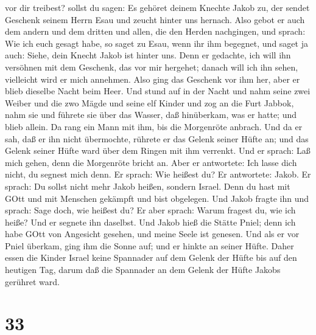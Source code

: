 vor dir treibest?  sollst du sagen: Es gehöret deinem
Knechte Jakob zu, der sendet Geschenk seinem Herrn Esau und zeucht
hinter uns hernach.  Also gebot er auch dem andern und dem
dritten und allen, die den Herden nachgingen, und sprach: Wie ich euch
gesagt habe, so saget zu Esau, wenn ihr ihm begegnet,  und
saget ja auch: Siehe, dein Knecht Jakob ist hinter uns. Denn er
gedachte, ich will ihn versöhnen mit dem Geschenk, das vor mir hergehet;
danach will ich ihn sehen, vielleicht wird er mich annehmen.
 Also ging das Geschenk vor ihm her, aber er blieb dieselbe
Nacht beim Heer.  Und stund auf in der Nacht und nahm seine
zwei Weiber und die zwo Mägde und seine elf Kinder und zog an die Furt
Jabbok,  nahm sie und führete sie über das Wasser, daß
hinüberkam, was er hatte;  und blieb allein. Da rang ein
Mann mit ihm, bis die Morgenröte anbrach.  Und da er sah,
daß er ihn nicht übermochte, rührete er das Gelenk seiner Hüfte an; und
das Gelenk seiner Hüfte ward über dem Ringen mit ihm verrenkt.
 Und er sprach: Laß mich gehen, denn die Morgenröte bricht
an. Aber er antwortete: Ich lasse dich nicht, du segnest mich denn.
 Er sprach: Wie heißest du? Er antwortete: Jakob.
 Er sprach: Du sollst nicht mehr Jakob heißen, sondern
Israel. Denn du hast mit GOtt und mit Menschen gekämpft und bist
obgelegen.  Und Jakob fragte ihn und sprach: Sage doch, wie
heißest du? Er aber sprach: Warum fragest du, wie ich heiße? Und er
segnete ihn daselbst.  Und Jakob hieß die Stätte Pniel;
denn ich habe GOtt von Angesicht gesehen, und meine Seele ist genesen.
 Und als er vor Pniel überkam, ging ihm die Sonne auf; und
er hinkte an seiner Hüfte.  Daher essen die Kinder Israel
keine Spannader auf dem Gelenk der Hüfte bis auf den heutigen Tag, darum
daß die Spannader an dem Gelenk der Hüfte Jakobs gerühret ward.

\hypertarget{section-32}{%
\section{33}\label{section-32}}

